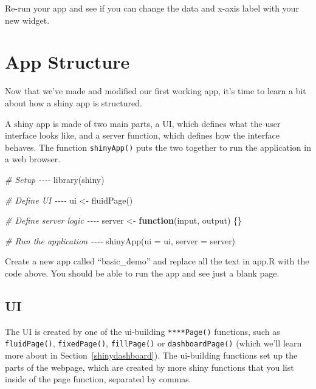 \documentclass[
  oneside]{book}
\newenvironment{Shaded}{\begin{snugshade}}{\end{snugshade}}
\newcommand{\AttributeTok}[1]{\textcolor[rgb]{0.77,0.63,0.00}{#1}}
\newcommand{\CommentTok}[1]{\textcolor[rgb]{0.56,0.35,0.01}{\textit{#1}}}
\newcommand{\ControlFlowTok}[1]{\textcolor[rgb]{0.13,0.29,0.53}{\textbf{#1}}}
\newcommand{\FunctionTok}[1]{\textcolor[rgb]{0.00,0.00,0.00}{#1}}
\newcommand{\NormalTok}[1]{#1}
\newcommand{\OtherTok}[1]{\textcolor[rgb]{0.56,0.35,0.01}{#1}}
\begin{document}
Re-run your app and see if you can change the data and x-axis label with your new widget.

\hypertarget{app-structure}{%
\section{App Structure}\label{app-structure}}

Now that we've made and modified our first working app, it's time to learn a bit about how a shiny app is structured.

A shiny app is made of two main parts, a UI, which defines what the user interface looks like, and a server function, which defines how the interface behaves. The function \texttt{shinyApp}\texttt{()} puts the two together to run the application in a web browser.

\begin{Shaded}
\begin{Highlighting}[]
\CommentTok{\# Setup {-}{-}{-}{-}}
\FunctionTok{library}\NormalTok{(shiny)}

\CommentTok{\# Define UI {-}{-}{-}{-}}
\NormalTok{ui }\OtherTok{\textless{}{-}} \FunctionTok{fluidPage}\NormalTok{()}

\CommentTok{\# Define server logic {-}{-}{-}{-}}
\NormalTok{server }\OtherTok{\textless{}{-}} \ControlFlowTok{function}\NormalTok{(input, output) \{\}}

\CommentTok{\# Run the application {-}{-}{-}{-}}
\FunctionTok{shinyApp}\NormalTok{(}\AttributeTok{ui =}\NormalTok{ ui, }\AttributeTok{server =}\NormalTok{ server)}
\end{Highlighting}
\end{Shaded}

\begin{try}
Create a new app called ``basic\_demo'' and replace all the text in app.R with the code above. You should be able to run the app and see just a blank page.

\end{try}

\hypertarget{ui}{%
\subsection{UI}\label{ui}}

The UI is created by one of the ui-building \texttt{****Page()} functions, such as \texttt{fluidPage}\texttt{()}, \texttt{fixedPage}\texttt{()}, \texttt{fillPage}\texttt{()} or \texttt{dashboardPage}\texttt{()} (which we'll learn more about in Section~\ref{shinydashboard}). The ui-building functions set up the parts of the webpage, which are created by more shiny functions that you list inside of the page function, separated by commas.
\end{document}
